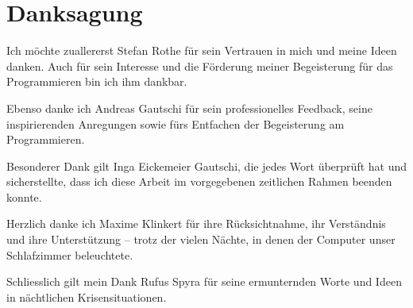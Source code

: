 \chapter*{Danksagung}
\label{cha:ack}

\begingroup
\fontsize{12pt}{14pt}\selectfont

Ich möchte zuallererst Stefan Rothe für sein Vertrauen in mich und meine Ideen danken.  
Auch für sein Interesse und die Förderung meiner Begeisterung für das Programmieren bin ich ihm dankbar.

Ebenso danke ich Andreas Gautschi für sein professionelles Feedback, seine inspirierenden Anregungen sowie fürs Entfachen der Begeisterung am Programmieren.

Besonderer Dank gilt Inga Eickemeier Gautschi, die jedes Wort überprüft hat und sicherstellte, dass ich diese Arbeit im vorgegebenen zeitlichen Rahmen beenden konnte.

Herzlich danke ich Maxime Klinkert für ihre Rücksichtnahme, ihr Verständnis und ihre Unterstützung – trotz der vielen Nächte, in denen der Computer unser Schlafzimmer beleuchtete.

Schliesslich gilt mein Dank Rufus Spyra für seine ermunternden Worte und Ideen in nächtlichen Krisensituationen.

\endgroup